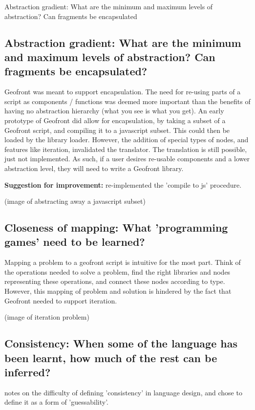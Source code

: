 Abstraction gradient: What are the minimum and maximum levels of abstraction? Can fragments be encapsulated

\subsection*{Abstraction gradient: What are the minimum and maximum levels of abstraction? Can fragments be encapsulated?}

Geofront was meant to support encapsulation. 
The need for re-using parts of a script as components / functions was deemed more important than the benefits of having no abstraction hierarchy (what you see is what you get).
An early prototype of Geofront did allow for encapsulation, by taking a subset of a Geofront script, and compiling it to a javascript subset. This could then be loaded by the library loader. 
However, the addition of special types of nodes, and features like iteration, invalidated the  translator.
The translation is still possible, just not implemented.  
As such, if a user desires re-usable components and a lower abstraction level, they will need to write a Geofront library.

\textbf{Suggestion for improvement:} re-implemented the 'compile to js' procedure.

(image of abstracting away a javascript subset)



\subsection*{Closeness of mapping: What 'programming games' need to be learned?}

Mapping a problem to a geofront script is intuitive for the most part.
Think of the operations needed to solve a problem, 
find the right libraries and nodes representing these operations,
and connect these nodes according to type. 
However, this mapping of problem and solution is hindered by the fact that Geofront needed to support iteration. 

(image of iteration problem)



\subsection*{Consistency: When some of the language has been learnt, how much of the rest can be inferred?}

\cite[]{green_usability_1996} notes on the difficulty of defining 'consistency' in language design, and chose to define it as a form of 'guessability'.

